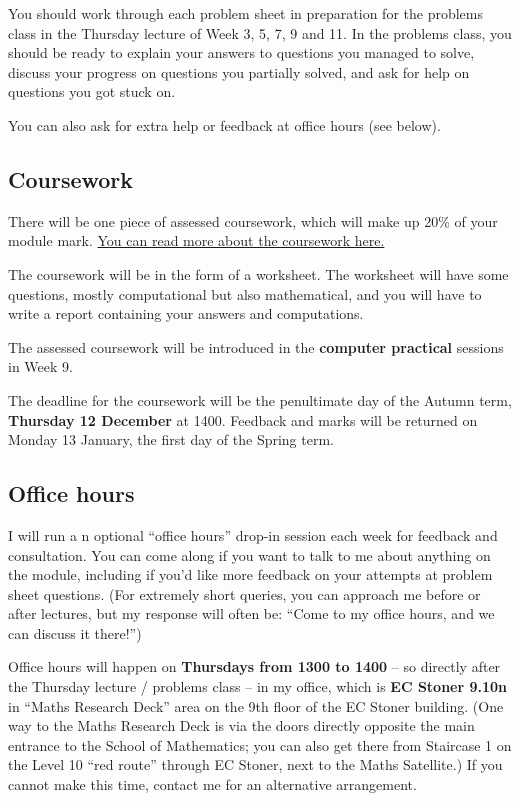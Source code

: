 \documentclass[
  letterpaper,
  DIV=11,
  numbers=noendperiod]{scrreprt}
\theoremstyle{plain}
\theoremstyle{definition}
\theoremstyle{definition}
\theoremstyle{remark}
\begin{document}
You should work through each problem sheet in preparation for the
problems class in the Thursday lecture of Week 3, 5, 7, 9 and 11. In the
problems class, you should be ready to explain your answers to questions
you managed to solve, discuss your progress on questions you partially
solved, and ask for help on questions you got stuck on.

You can also ask for extra help or feedback at office hours (see below).

\subsection*{Coursework}\label{coursework}

There will be one piece of assessed coursework, which will make up 20\%
of your module mark. \hyperref[coursework]{You can read more about the
coursework here.}

The coursework will be in the form of a worksheet. The worksheet will
have some questions, mostly computational but also mathematical, and you
will have to write a report containing your answers and computations.

The assessed coursework will be introduced in the \textbf{computer
practical} sessions in Week 9.

The deadline for the coursework will be the penultimate day of the
Autumn term, \textbf{Thursday 12 December } at 1400. Feedback and marks
will be returned on Monday 13 January, the first day of the Spring term.

\subsection*{Office hours}\label{office-hours}

I will run a n optional ``office hours'' drop-in session each week for
feedback and consultation. You can come along if you want to talk to me
about anything on the module, including if you'd like more feedback on
your attempts at problem sheet questions. (For extremely short queries,
you can approach me before or after lectures, but my response will often
be: ``Come to my office hours, and we can discuss it there!'')

Office hours will happen on \textbf{Thursdays from 1300 to 1400} -- so
directly after the Thursday lecture / problems class -- in my office,
which is \textbf{EC Stoner 9.10n} in ``Maths Research Deck'' area on the
9th floor of the EC Stoner building. (One way to the Maths Research Deck
is via the doors directly opposite the main entrance to the School of
Mathematics; you can also get there from Staircase 1 on the Level 10
``red route'' through EC Stoner, next to the Maths Satellite.) If you
cannot make this time, contact me for an alternative arrangement.
\end{document}
